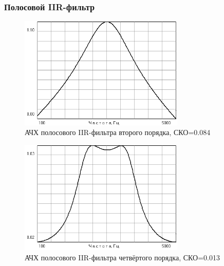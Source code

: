 \documentclass[a4paper,14pt]{extarticle}
\begin{document}
\subsubsection{Полосовой IIR-фильтр}
\begin{figure}[H]
  \centering
  \includegraphics[width=0.7\textwidth]{Z1_PPF/gain_IIR_2p.png}
  \caption{АЧХ полосового IIR-фильтра второго порядка, СКО=0.084}
  \label{fig:IIR_2p}
\end{figure}
\begin{figure}[H]
  \centering
  \includegraphics[width=0.7\textwidth]{Z1_PPF/gain_IIR_4p.png}
  \caption{АЧХ полосового IIR-фильтра четвёртого порядка, СКО=0.013}
  \label{fig:IIR_4p}
\end{figure}
\end{document}
